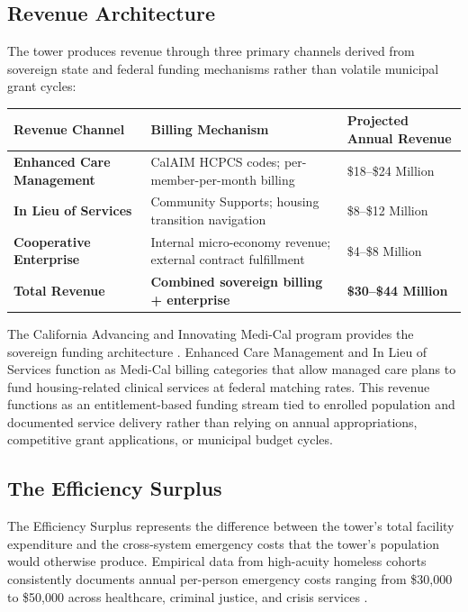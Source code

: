 \documentclass[12pt, letterpaper]{article}
\begin{document}
\subsection{Revenue Architecture}

The tower produces revenue through three primary channels derived from sovereign state and federal funding mechanisms rather than volatile municipal grant cycles:

\begin{table}[H]
\centering
\begin{tabularx}{\textwidth}{@{}lXX@{}}
\toprule
\textbf{Revenue Channel} & \textbf{Billing Mechanism} & \textbf{Projected Annual Revenue} \\
\midrule
\textbf{Enhanced Care Management} & CalAIM HCPCS codes; per-member-per-month billing & \$18--\$24 Million \\
\textbf{In Lieu of Services} & Community Supports; housing transition navigation & \$8--\$12 Million \\
\textbf{Cooperative Enterprise} & Internal micro-economy revenue; external contract fulfillment & \$4--\$8 Million \\
\textbf{Total Revenue} & \textbf{Combined sovereign billing + enterprise} & \textbf{\$30--\$44 Million} \\
\bottomrule
\end{tabularx}
\end{table}

The California Advancing and Innovating Medi-Cal program provides the sovereign funding architecture \citep{dhcs_calaim_2024}. Enhanced Care Management and In Lieu of Services function as Medi-Cal billing categories that allow managed care plans to fund housing-related clinical services at federal matching rates. This revenue functions as an entitlement-based funding stream tied to enrolled population and documented service delivery rather than relying on annual appropriations, competitive grant applications, or municipal budget cycles.

\subsection{The Efficiency Surplus}

The Efficiency Surplus represents the difference between the tower's total facility expenditure and the cross-system emergency costs that the tower's population would otherwise produce. Empirical data from high-acuity homeless cohorts consistently documents annual per-person emergency costs ranging from \$30,000 to \$50,000 across healthcare, criminal justice, and crisis services \citep{culhane_metraux_hadley_2002, larimer_2009}.
\end{document}
